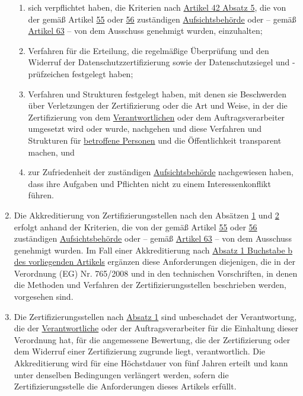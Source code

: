 \begin{enumerate}
\begin{enumerate}
    \item sich verpflichtet haben, die Kriterien nach \hyperref[itm:42-5]{Artikel 42 Absatz 5}, die von der gemäß
     Artikel \hyperref[ch:55]{55} oder \hyperref[ch:56]{56} zuständigen \hyperref[itm:04-21]{Aufsichtsbehörde} oder -- gemäß \hyperref[ch:63]
     {Artikel 63} -- von dem Ausschuss genehmigt wurden, einzuhalten;
    \label{itm:43-2b}

    \item Verfahren für die Erteilung, die regelmäßige Überprüfung und den Widerruf der Datenschutzzertifizierung sowie
     der Datenschutzsiegel und -prüfzeichen festgelegt haben;
    \label{itm:43-2c}

    \item Verfahren und Strukturen festgelegt haben, mit denen sie Beschwerden über Verletzungen der Zertifizierung oder
     die Art und Weise, in der die Zertifizierung von dem \hyperref[itm:04-7]{Verantwortlichen} oder dem Auftragsverarbeiter umgesetzt wird
     oder wurde, nachgehen und diese Verfahren und Strukturen für \hyperref[itm:04-1]{betroffene Personen} und die Öffentlichkeit
     transparent machen, und
    \label{itm:43-2d}

    \item zur Zufriedenheit der zuständigen \hyperref[itm:04-21]{Aufsichtsbehörde} nachgewiesen haben, dass ihre Aufgaben und Pflichten nicht
     zu einem Interessenkonflikt führen.
    \label{itm:43-2e}

  \end{enumerate}

  \item Die Akkreditierung von Zertifizierungsstellen nach den Absätzen \hyperref[itm:43-1]{1} und \hyperref[itm:43-2]
   {2} erfolgt anhand der Kriterien, die von der gemäß Artikel \hyperref[ch:55]{55} oder \hyperref[ch:56]
   {56} zuständigen \hyperref[itm:04-21]{Aufsichtsbehörde} oder -- gemäß \hyperref[ch:63]{Artikel 63} -- von dem Ausschuss genehmigt wurden.
   Im Fall einer Akkreditierung nach \hyperref[itm:43-1b]{Absatz 1 Buchstabe b des vorliegenden Artikels} ergänzen
   diese Anforderungen diejenigen, die in der Verordnung (EG) Nr. 765/2008 und in den
   technischen Vorschriften, in denen die Methoden und Verfahren der Zertifizierungsstellen beschrieben werden,
   vorgesehen sind.
  \label{itm:43-3}

  \item Die Zertifizierungsstellen nach \hyperref[itm:43-1]{Absatz 1} sind unbeschadet der Verantwortung, die der
   \hyperref[itm:04-7]{Verantwortliche} oder der Auftragsverarbeiter für die Einhaltung dieser Verordnung hat, für die angemessene
   Bewertung, die der Zertifizierung oder dem Widerruf einer Zertifizierung zugrunde liegt, verantwortlich. Die
   Akkreditierung wird für eine Höchstdauer von fünf Jahren erteilt und kann unter denselben Bedingungen verlängert
   werden, sofern die Zertifizierungsstelle die Anforderungen dieses Artikels erfüllt.
  \label{itm:43-4}


\end{enumerate}
